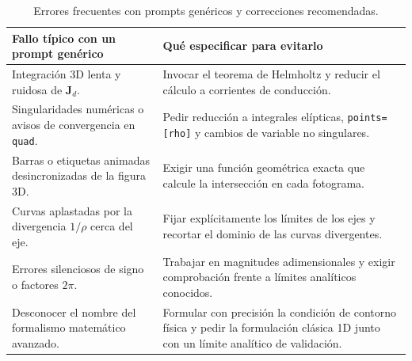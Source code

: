 \documentclass[11pt]{article}
\begin{document}
\begin{table}[ht]
\centering
\small
\caption{Errores frecuentes con prompts genéricos y correcciones recomendadas.}
\label{tab:checklist}
\begin{tabular}{@{}p{5.8cm}p{9.2cm}@{}}
\toprule
\textbf{Fallo típico con un prompt genérico} & \textbf{Qué especificar para evitarlo} \\
\midrule
Integración 3D lenta y ruidosa de $\mathbf{J}_d$. & Invocar el teorema de Helmholtz y reducir el cálculo a corrientes de conducción. \\
Singularidades numéricas o avisos de convergencia en \texttt{quad}. & Pedir reducción a integrales elípticas, \texttt{points=[rho]} y cambios de variable no singulares. \\
Barras o etiquetas animadas desincronizadas de la figura 3D. & Exigir una función geométrica exacta que calcule la intersección en cada fotograma. \\
Curvas aplastadas por la divergencia $1/\rho$ cerca del eje. & Fijar explícitamente los límites de los ejes y recortar el dominio de las curvas divergentes. \\
Errores silenciosos de signo o factores $2\pi$. & Trabajar en magnitudes adimensionales y exigir comprobación frente a límites analíticos conocidos. \\
Desconocer el nombre del formalismo matemático avanzado. & Formular con precisión la condición de contorno física y pedir la formulación clásica 1D junto con un límite analítico de validación. \\
\bottomrule
\end{tabular}
\end{table}
\end{document}
